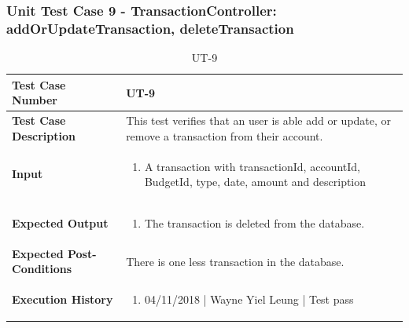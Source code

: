 \documentclass[12pt]{article}
\begin{document}
\subsubsection{Unit Test Case 9 - TransactionController: addOrUpdateTransaction, deleteTransaction}
\def\arraystretch{1.5}%
\begin{table}[htbp]
\centering
\caption{UT-9}
\label{UT-9}
\begin{tabularx}{\textwidth}{ | l | X |}
\hline
\textbf{Test Case Number}      		&  UT-9                   			\\ \hline
\textbf{Test Case Description}    	&  This test verifies that an user is able add or update, or remove a transaction from their account.                				\\ \hline
\textbf{Input}         			&
\begin{enumerate}
\item A transaction with transactionId, accountId, BudgetId, type, date, amount and description
\end{enumerate} 		\\ \hline
\textbf{Expected Output}     		&
\begin{enumerate}
\item The transaction is deleted from the database.
\end{enumerate} 		\\ \hline
\textbf{Expected Post-Conditions}	& There is one less transaction in the database. \\ \hline
\textbf{Execution History}   		&
\begin{enumerate}
\item 04/11/2018 | Wayne Yiel Leung | Test pass
\end {enumerate} \\ \hline
\end{tabularx}
\end{table}
\clearpage


\end{document}
